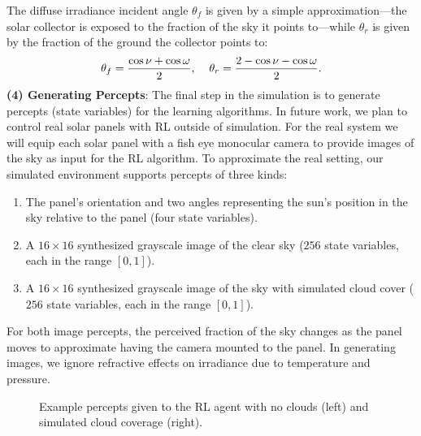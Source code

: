 \documentclass{article}
\begin{document}
The diffuse irradiance incident angle $\theta_f$ is given by a simple approximation---the solar collector is exposed to the fraction of the sky it points to---while $\theta_r$ is given by the fraction of the ground the collector points to:
\begin{equation}
\theta_f = \frac{\cos \nu + \cos \omega}{2}, \hspace{4mm} \theta_r = \frac{2 - \cos\nu - \cos \omega}{2}.
\end{equation}
{\bf (4) Generating Percepts}: The final step in the simulation is to generate percepts (state variables) for the learning algorithms. In future work, we plan to control real solar panels with RL outside of simulation. For the real system we will equip each solar panel with a fish eye monocular camera to provide images of the sky as input for the RL algorithm. To approximate the real setting, our simulated environment supports percepts of three kinds:
\begin{enumerate}
\item The panel's orientation and two angles representing the sun's position in the sky relative to the panel (four state variables).
\item A $16 \times 16$ synthesized grayscale image of the clear sky ($256$ state variables, each in the range $[0,1]$).
\item A $16\times 16$ synthesized grayscale image of the sky with simulated cloud cover ($256$ state variables, each in the range $[0,1]$).
\end{enumerate}
For both image percepts, the perceived fraction of the sky changes as the panel moves to approximate having the camera mounted to the panel. In generating images, we ignore refractive effects on irradiance due to temperature and pressure.

\begin{figure}[t]
\begin{center}
 \hspace{16mm} %
\caption{Example percepts given to the RL agent with no clouds (left) and simulated cloud coverage (right).}
\end{center}
\end{figure}
\end{document}
